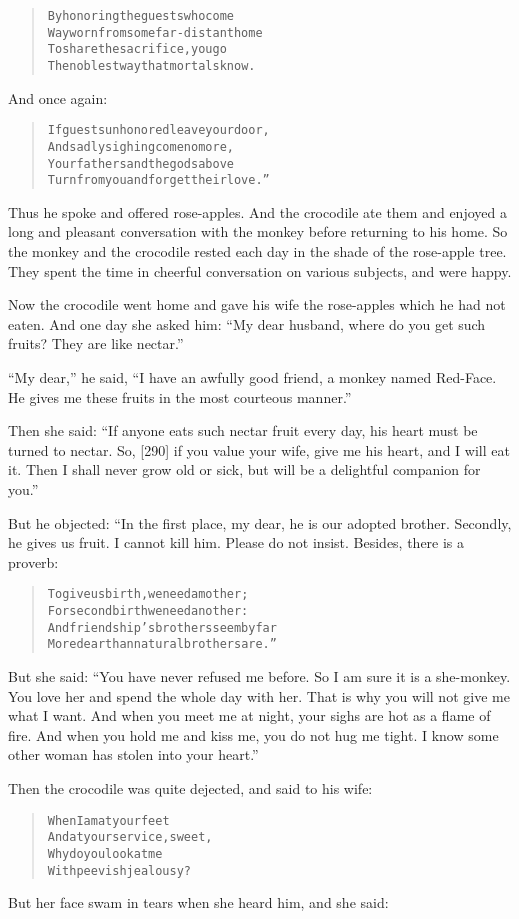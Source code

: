 \documentclass[article, twoside, 14pt]{memoir}
\renewenvironment{verbatim}{%
\begin{quote}%
\vskip -10pt%
\begin{alltt}\normalfont\large}{\end{alltt}%
\end{quote}%
\vskip -10pt
} %
\begin{document}
\begin{verbatim}
By honoring the guests who come
Wayworn from some far-distant home
To share the sacrifice, you go
The noblest way that mortals know.
\end{verbatim}
And once again:

\begin{verbatim}
If guests unhonored leave your door,
And sadly sighing come no more,
Your fathers and the gods above
Turn from you and forget their love.”
\end{verbatim}
Thus he spoke and offered rose-apples. And the crocodile ate them
and enjoyed a long and pleasant conversation with the monkey before
returning to his home. So the monkey and the crocodile rested each
day in the shade of the rose-apple tree. They spent the time in
cheerful conversation on various subjects, and were happy.

Now the crocodile went home and gave his wife the rose-apples which
he had not eaten. And one day she asked him:
``My dear husband, where do you get such fruits? They are like nectar.''

``My dear,'' he said,
``I have an awfully good friend, a monkey named Red-Face. He gives me these fruits in the most courteous manner.''

Then she said:
``If anyone eats such nectar fruit every day, his heart must be turned to nectar. So, [290] if you value your wife, give me his heart, and I will eat it. Then I shall never grow old or sick, but will be a delightful companion for you.''

But he objected: “In the first place, my dear, he is our adopted
brother. Secondly, he gives us fruit. I cannot kill him. Please do
not insist. Besides, there is a proverb:

\begin{verbatim}
To give us birth, we need a mother;
For second birth we need another:
And friendship's brothers seem by far
More dear than natural brothers are.”
\end{verbatim}
But she said:
``You have never refused me before. So I am sure it is a she-monkey. You love her and spend the whole day with her. That is why you will not give me what I want. And when you meet me at night, your sighs are hot as a flame of fire. And when you hold me and kiss me, you do not hug me tight. I know some other woman has stolen into your heart.''

Then the crocodile was quite dejected, and said to his wife:

\begin{verbatim}
When I am at your feet
And at your service, sweet,
Why do you look at me
With peevish jealousy?
\end{verbatim}
But her face swam in tears when she heard him, and she said:
\end{document}
